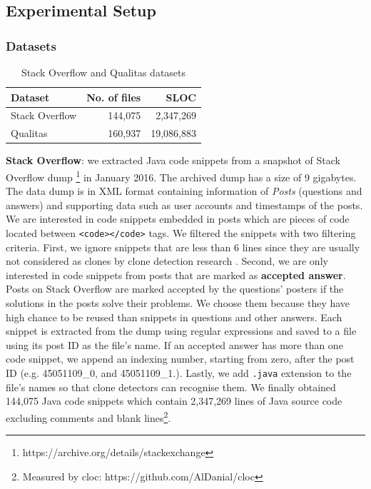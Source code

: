 \documentclass{sig-alternate-05-2015}
\begin{document}
\subsection{Experimental Setup}

\subsubsection{Datasets}
\begin{table}
	\centering
	\caption{Stack Overflow and Qualitas datasets}
	\label{tab:datasets}
	\small
	\begin{tabular}{l|r|r}
		\hline 
		Dataset & No. of files & SLOC \\
		\hline
		Stack Overflow & 144,075 & 2,347,269 \\ 
		\hline 
		Qualitas &  160,937 & 19,086,883 \\ 
		\hline 
	\end{tabular} 
\end{table}

\textbf{Stack Overflow}: we extracted Java code snippets from a snapshot of Stack Overflow dump \footnote{https://archive.org/details/stackexchange} in January 2016. The archived dump has a size of 9 gigabytes. The data dump is in XML format containing information of \textit{Posts} (questions and answers) and supporting data such as user accounts and timestamps of the posts. We are interested in code snippets embedded in posts which are pieces of code located between \texttt{<code></code>} tags. We filtered the snippets with two filtering criteria. First, we ignore snippets that are less than 6 lines since they are usually not considered as clones by clone detection research \cite{something}. Second, we are only interested in code snippets from posts that are marked as \textbf{accepted answer}. Posts on Stack Overflow are marked accepted by the questions' posters if the solutions in the posts solve their problems. We choose them because they have high chance to be reused than snippets in questions and other answers. Each snippet is extracted from the dump using regular expressions and saved to a file using its post ID as the file's name. If an accepted answer has more than one code snippet, we append an indexing number, starting from zero, after the post ID (e.g. 45051109\_0, and 45051109\_1.). Lastly, we add \texttt{.java} extension to the file's names so that clone detectors can recognise them. We finally obtained 144,075 Java code snippets which contain 2,347,269 lines of Java source code excluding comments and blank lines\footnote{Measured by cloc: https://github.com/AlDanial/cloc}.
\end{document}
